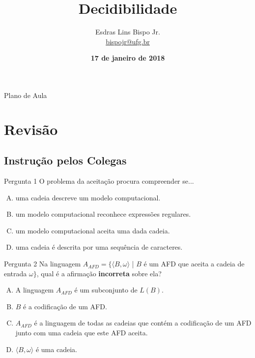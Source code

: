 \documentclass[xcolor=dvipsnames,table]{beamer}
\title{Decidibilidade}
\author{
  Esdras Lins Bispo Jr. \\ \url{bispojr@ufg.br}
  }
\institute{
  Teoria da Computação \\Bacharelado em Ciência da Computação}
\date{\textbf{17 de janeiro de 2018} }
\begin{document}
	\begin{frame}
		\titlepage
	\end{frame}

	\AtBeginSection{
		\begin{frame}{Sumário}%
    		\tableofcontents[currentsection]
		\end{frame}
	}

	\begin{frame}{Plano de Aula}
		\tableofcontents
	\end{frame}
	
	
	\section{Revisão}
	\subsection{Instrução pelos Colegas}
	\begin{frame}
		\begin{block}{Pergunta 1}
			O problema da aceitação procura compreender se...
		\end{block}
		\begin{enumerate}[(A)]
			\item uma cadeia descreve um modelo computacional.
			\item um modelo computacional reconhece expressões regulares.
			\item um modelo computacional aceita uma dada cadeia.
			\item uma cadeia é descrita por uma sequência de caracteres.
		\end{enumerate}
	\end{frame}

	\begin{frame}
		\begin{block}{Pergunta 2}
			Na linguagem $A_{AFD} = \{\langle B, \omega \rangle$ | $B$ é um AFD que aceita a cadeia de entrada $\omega \}$, qual é a afirmação {\bf incorreta} sobre ela?
		\end{block}
		\begin{enumerate}[(A)]
			\item A linguagem $A_{AFD}$ é um subconjunto de $L(B)$.
			\item $B$ é a codificação de um AFD.
			\item $A_{AFD}$ é a linguagem de todas as cadeias que contém a codificação de um AFD junto com uma cadeia que este AFD aceita.
			\item $\langle B, \omega \rangle$ é uma cadeia.
			
		\end{enumerate}
	\end{frame}
\end{document}
